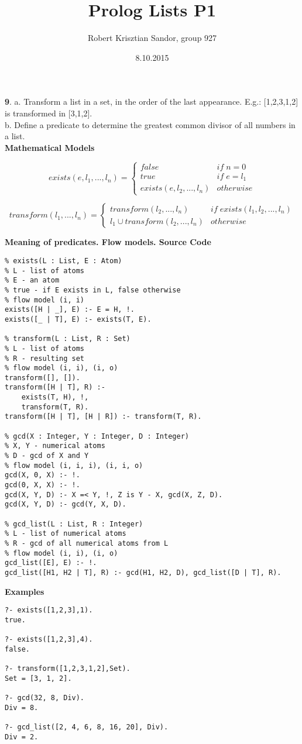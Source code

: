 \documentclass[11pt]{article}
\title{\textbf{Prolog Lists P1}}
\author{Robert Krisztian Sandor, group 927}
\date{8.10.2015}
\begin{document}
\maketitle

\textbf{9}. a. Transform a list in a set, in the order of the last appearance. E.g.: [1,2,3,1,2] is transformed in [3,1,2]. \\

b. Define a predicate to determine the greatest common divisor of all numbers in a list. \\

\textbf{Mathematical Models}

\[
exists(e, l_1, ..., l_n) = 
\left \{
	\begin{array}{ll}
		false & if \; n = 0 \\
		true & if \; e = l_1 \\
		exists(e, l_2, ..., l_n) & otherwise
	\end{array}
\right.
\]

\[
transform(l_1, ..., l_n) = 
\left \{
	\begin{array}{ll}
		transform(l_2, ..., l_n) & if \; exists(l_1, l_2, ..., l_n) \\
		l_1 \cup transform(l_2, ..., l_n) & otherwise
	\end{array}
\right.
\]

\textbf{Meaning of predicates. Flow models. Source Code}

\begin{verbatim}
% exists(L : List, E : Atom)
% L - list of atoms
% E - an atom
% true - if E exists in L, false otherwise
% flow model (i, i)
exists([H | _], E) :- E = H, !.
exists([_ | T], E) :- exists(T, E).

% transform(L : List, R : Set)
% L - list of atoms
% R - resulting set
% flow model (i, i), (i, o)
transform([], []).
transform([H | T], R) :-
    exists(T, H), !,
    transform(T, R).
transform([H | T], [H | R]) :- transform(T, R).

% gcd(X : Integer, Y : Integer, D : Integer)
% X, Y - numerical atoms
% D - gcd of X and Y
% flow model (i, i, i), (i, i, o)
gcd(X, 0, X) :- !.
gcd(0, X, X) :- !.
gcd(X, Y, D) :- X =< Y, !, Z is Y - X, gcd(X, Z, D).
gcd(X, Y, D) :- gcd(Y, X, D).

% gcd_list(L : List, R : Integer)
% L - list of numerical atoms
% R - gcd of all numerical atoms from L
% flow model (i, i), (i, o)
gcd_list([E], E) :- !.
gcd_list([H1, H2 | T], R) :- gcd(H1, H2, D), gcd_list([D | T], R).
\end{verbatim}

\textbf{Examples}
\begin{verbatim}
?- exists([1,2,3],1).
true.

?- exists([1,2,3],4).
false.

?- transform([1,2,3,1,2],Set).
Set = [3, 1, 2].

?- gcd(32, 8, Div).
Div = 8.

?- gcd_list([2, 4, 6, 8, 16, 20], Div).
Div = 2.

\end{verbatim}
\end{document}
